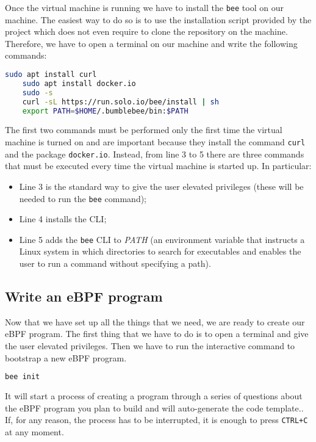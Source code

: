 Once the virtual machine is running we have to install the \verb|bee| tool on our machine.
The easiest way to do so is to use the installation script provided by the project which does not even require to clone the repository on the machine.
Therefore, we have to open a terminal on our machine and write the following commands:

\begin{lstlisting}[language=bash, caption={bee installation commands}]
	sudo apt install curl
	sudo apt install docker.io 
	sudo -s
	curl -sL https://run.solo.io/bee/install | sh 
	export PATH=$HOME/.bumblebee/bin:$PATH
\end{lstlisting}

The first two commands must be performed only the first time the virtual machine is turned on and are important because they install the command \verb|curl| and the package \verb|docker.io|.
Instead, from line 3 to 5 there are three commands that must be executed every time the virtual machine is started up.
In particular:

\begin{itemize}
	\item Line 3 is the standard way to give the user elevated privileges (these will 
		be needed to run the \verb|bee| command);
	\item Line 4 installs the CLI;
	\item Line 5 adds the \verb|bee| CLI to \textit{PATH} (an environment variable 
		that instructs a Linux system in which directories to search for executables and enables the user to run a command without specifying a path).
\end{itemize}

\subsection{Write an eBPF program}

Now that we have set up all the things that we need, we are ready to create our eBPF program.
The first thing that we have to do is to open a terminal and give the user elevated privileges.
Then we have to run the interactive command to bootstrap a new eBPF program.

\begin{lstlisting}[language=bash, caption={bee init command}]
	bee init
\end{lstlisting}

It will start a process of creating a program through a series of questions about the eBPF program you plan to build and will auto-generate the code template..
If, for any reason, the process has to be interrupted, it is enough to press \verb|CTRL+C| at any moment.

